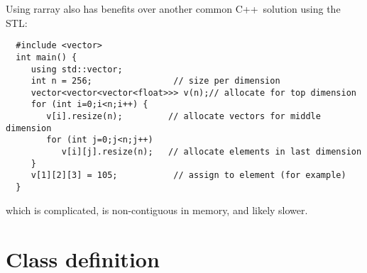 \documentclass[11pt,twoside]{article}
\newcommand{\cxx}{C{++}}
\begin{document}
Using rarray also has benefits over another common \cxx\ 
solution using the STL:
\vspace{-5pt}\begin{framed}\vspace{-14pt}%
\begin{verbatim}
  #include <vector>
  int main() {
     using std::vector;
     int n = 256;                // size per dimension
     vector<vector<vector<float>>> v(n);// allocate for top dimension
     for (int i=0;i<n;i++) {
        v[i].resize(n);         // allocate vectors for middle dimension
        for (int j=0;j<n;j++) 
           v[i][j].resize(n);   // allocate elements in last dimension
     }
     v[1][2][3] = 105;           // assign to element (for example)
  }
\end{verbatim}%
\vspace{-14pt}\end{framed}\vspace{-8pt}
\noindent
which is complicated, is non-contiguous in memory, and likely
slower. 

\section{Class definition}
\end{document}
